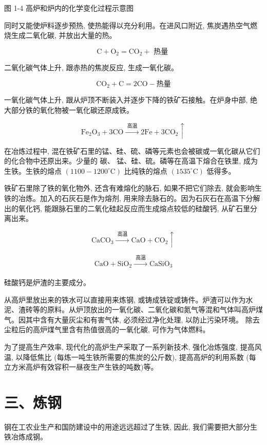\documentclass[10pt]{article}
\begin{document}
图 1-4 高炉和炉内的化学变化过程示意图

同时又能使炉料逐步预热, 使热能得以充分利用。在进风口附近, 焦炭遇热空气燃烧生成二氧化碳, 并放出大量的热。

\[
\mathrm{C} + {\mathrm{O}}_{2} = {\mathrm{{CO}}}_{2} + \text{ 热量 }
\]

二氧化碳气体上升, 跟赤热的焦炭反应, 生成一氧化碳。

\[
{\mathrm{{CO}}}_{2} + \mathrm{C} = 2\mathrm{{CO}} - \text{热量}
\]

一氧化碳气体上升, 跟从炉顶不断装入并逐步下降的铁矿石接触。在炉身中部, 绝大部分铁的氧化物被一氧化碳还原成铁。

\[
{\mathrm{{Fe}}}_{2}{\mathrm{O}}_{3} + 3\mathrm{{CO}}\xrightarrow[]{\text{ 高温 }}2\mathrm{{Fe}} + 3{\mathrm{{CO}}}_{2} \uparrow
\]

在冶炼过程中, 混在铁矿石里的锰、硅、硫、磷等元素也会被碳或一氧化碳从它们的化合物中还原出来。少量的 碳、 锰、硅、硫。磷等在高温下熔合在铁里, 成为生铁。生铁的熔点 \(\left( {{1100} - {1200}^{ \circ }\mathrm{C}}\right)\) 比纯铁的熔点 \(\left( {{1535}^{ \circ }\mathrm{C}}\right)\) 低得多。

铁矿石里除了铁的氧化物外, 还含有难熔化的脉石, 如果不把它们除去, 就会影响生铁的冶炼。加入的石灰石是作为熔剂, 用来除去脉石的。因为石灰石在高温下分解出的氧化钙, 能跟脉石里的二氧化硅起反应而生成熔点较低的硅酸钙, 从矿石里分离出来。

\[
{\mathrm{{CaCO}}}_{3}\xrightarrow[]{\text{ 高温 }}\mathrm{{CaO}} + {\mathrm{{CO}}}_{2} \uparrow
\]

\[
\mathrm{{CaO}} + {\mathrm{{SiO}}}_{2}\xrightarrow[]{\text{ 高温 }}{\mathrm{{CaSiO}}}_{3}
\]

硅酸钙是炉渣的主要成分。

从高炉里放出来的铁水可以直接用来炼钢, 或铸成铁锭或铸件。炉渣可以作为水泥、渣砖等的原料。从炉顶放出的一氧化碳、二氧化碳和氮气等混和气体叫高炉煤气。因其中含有大量灰尘和有害气体, 必须经过净化处理, 以防止污染环境。 除去尘粒后的高炉煤气里含有热值很高的一氧化碳, 可作为气体燃料。

为了提高生产效率, 现代化的高炉生产采取了一系列新技术, 强化冶炼强度, 提高风温, 以降低焦比 (每炼一吨生铁所需要的焦炭的公斤数), 提高高炉的利用系数 (每立方米高炉有效容积一昼夜生产生铁的吨数)等。

\section*{三、炼钢}

钢在工农业生产和国防建设中的用途远远超过了生铁, 因此, 我们需要把大部分生铁冶炼成钢。
\end{document}
